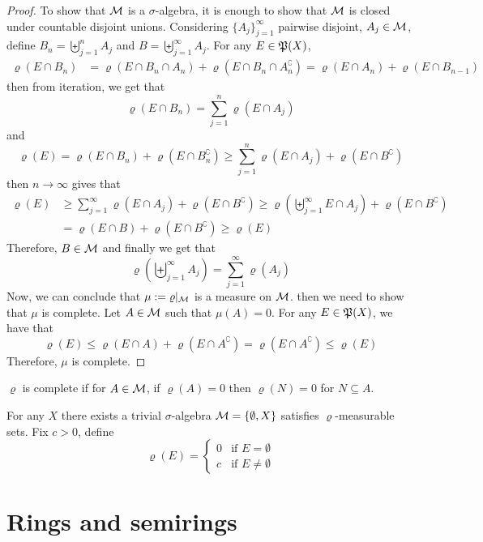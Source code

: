 \begin{proof}
  To show that $\mathcal M$ is a $\sigma$-algebra, it is enough to show that $\mathcal M$ is closed under countable disjoint unions.
  Considering $\{A_j\}_{j=1}^\infty$ pairwise disjoint, $A_j \in \mathcal M$, define $B_n = \biguplus_{j=1}^n A_j$ and $B = \biguplus_{j=1}^\infty A_j$. For any $E \in \mathfrak P(X)$,
  \begin{align*}
    \varrho(E \cap B_n) &= \varrho(E \cap B_n \cap A_n) + \varrho(E \cap B_n \cap A_n^\complement) = \varrho(E \cap A_n) + \varrho(E \cap B_{n-1})
  \end{align*}
  then from iteration, we get that
  \[\varrho(E \cap B_n) = \sum_{j=1}^n \varrho(E \cap A_j)\]
  and
  \[\varrho(E) = \varrho(E \cap B_n) + \varrho(E \cap B_n^\complement) \ge \sum_{j=1}^n \varrho(E\cap A_j) + \varrho(E \cap B^\complement)\]
  then $n\to \infty$ gives that
  \begin{align*}
    \varrho(E) &\ge \sum_{j=1}^\infty \varrho(E \cap A_j) + \varrho(E \cap B^\complement) \ge \varrho\left(\biguplus_{j=1}^\infty E \cap A_j\right) + \varrho(E \cap B^\complement) \\
    &= \varrho(E \cap B) + \varrho(E \cap B^\complement) \ge \varrho(E)
  \end{align*}
  Therefore, $B \in \mathcal M$ and finally we get that
  \[\varrho\left(\biguplus_{j=1}^\infty A_j\right) = \sum_{j=1}^\infty \varrho(A_j)\]
  Now, we can conclude that $\mu := \varrho|_\mathcal M$ is a measure on $\mathcal M$.
  then we need to show that $\mu$ is complete.
  Let $A \in \mathcal M$ such that $\mu(A) = 0$.
  For any $E \in \mathfrak P(X)$, we have that
  \[\varrho(E) \le \varrho(E\cap A) + \varrho(E \cap A^\complement) = \varrho(E \cap A^\complement) \le \varrho(E)\]
  Therefore, $\mu$ is complete.
\end{proof}

\begin{definition}
  $\varrho$ is complete if for $A \in \mathcal M$, if $\varrho(A) = 0$ then $\varrho(N) = 0$ for $N \subseteq A$.
\end{definition}
\begin{example}
  For any $X$ there exists a trivial $\sigma$-algebra $\mathcal M = \{\emptyset, X\}$ satisfies $\varrho$-measurable sets.
  Fix $c > 0$, define 
  \[\varrho(E) = \begin{cases}
    0 & \text{if }E = \emptyset \\
    c & \text{if }E \neq \emptyset
  \end{cases}\]
\end{example}

\section{Rings and semirings}

